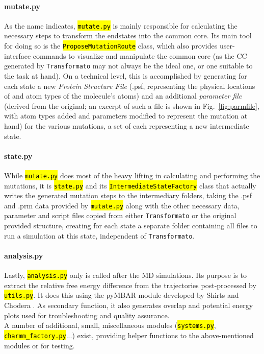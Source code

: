 \documentclass[oneside]{scrreprt}
\newcommand{\code}[1]{\texttt{\hl{#1}}}
\begin{document}
\paragraph{mutate.py}
As the name indicates, \code{mutate.py} is mainly responsible for calculating the necessary steps to transform the endstates into the common core. Its main tool for doing so is the \code{ProposeMutationRoute} class, which also provides user-interface commands to visualize and manipulate the common core (as the CC generated by \texttt{Transformato} may not always be the ideal one, or one suitable to the task at hand). On a technical level, this is accomplished by generating for each state a new \textit{Protein Structure File} (.psf, representing the physical locations of and atom types of the molecule's atoms) and an additional \textit{parameter file} (derived from the original; an excerpt of such a file is shown in Fig.~\ref{fig:parmfile}, with atom types added and parameters modified to represent the mutation at hand) for the various mutations, a set of each representing a new intermediate state.
\paragraph{state.py}
While \code{mutate.py} does most of the heavy lifting in calculating and performing the mutations, it is \code{state.py} and its \code{IntermediateStateFactory} class that actually writes the generated mutation steps to the intermediary folders, taking the .psf and .prm data provided by \code{mutate.py} along with the other necessary data, parameter and script files copied from either \texttt{Transformato} or the original provided structure, creating for each state a separate folder containing all files to run a simulation at this state, independent of \texttt{Transformato}.
\paragraph{analysis.py}
Lastly, \code{analysis.py} only is called after the MD simulations. Its purpose is  to extract the relative free energy difference from the trajectories post-processed by \code{utils.py}. It does this using the pyMBAR module developed by Shirts and Chodera \cite{shirts_statistically_2008,Shirts2016Sep}. As secondary function, it also generates overlap and potential energy plots used for troubleshooting and quality assurance.\\

A  number of additional, small, miscellaneous modules (\code{systems.py}, \code{charmm\_factory.py}...) exist, providing helper functions to the above-mentioned modules or for testing.
\end{document}
